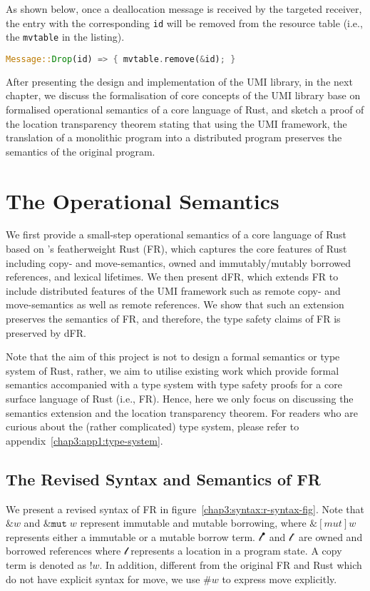 As shown below, once a deallocation message is received by the targeted receiver, the entry with the corresponding \texttt{id} will be removed from the resource table (i.e., the \texttt{mvtable} in the listing). 
\begin{lstlisting}[language=Rust, style=boxed, basicstyle=\footnotesize\ttfamily]
Message::Drop(id) => { mvtable.remove(&id); }
\end{lstlisting}

After presenting the design and implementation of the UMI library, in the next chapter, we discuss the formalisation of core concepts of the UMI library base on formalised operational semantics of a core language of Rust, and sketch a proof of the location transparency theorem stating that using the UMI framework, the translation of a monolithic program into a distributed program preserves the semantics of the original program.

\section{The Operational Semantics}
\label{chap3:semantics}
We first provide a small-step operational semantics of a core language of Rust based on \citet{10.1145/3443420}'s featherweight Rust (FR), which captures the core features of Rust including copy- and move-semantics, owned and immutably/mutably borrowed references, and lexical lifetimes. We then present dFR, which extends FR to include distributed features of the UMI framework such as remote copy- and move-semantics as well as remote references. We show that such an extension preserves the semantics of FR, and therefore, the type safety claims of FR is preserved by dFR.

Note that the aim of this project is not to design a formal semantics or type system of Rust, rather, we aim to utilise existing work which provide formal semantics accompanied with a type system with type safety proofs for a core surface language of Rust (i.e., FR). Hence, here we only focus on discussing the semantics extension and the location transparency theorem. For readers who are curious about the (rather complicated) type system, please refer to appendix~\ref{chap3:app1:type-system}.

\subsection{The Revised Syntax and Semantics of FR}
\label{chap3:semantics:fr}
We present a revised syntax of FR in figure~\ref{chap3:syntax:r-syntax-fig}. Note that $\&w$ and $\&\texttt{mut}\;w$ represent immutable and mutable borrowing, where $\&[mut] w$ represents either a immutable or a mutable borrow term. $\mathscr{l}^\bullet$ and $\mathscr{l}^\circ$ are owned and borrowed references where $\mathscr{l}$ represents a location in a program state. A copy term is denoted as $!w$. In addition, different from the original FR and Rust which do not have explicit syntax for move, we use $\#w$ to express move explicitly.

